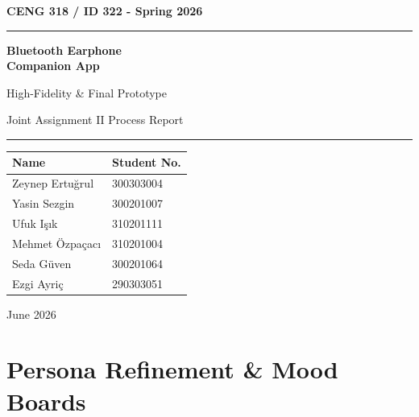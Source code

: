 \documentclass[12pt, a4paper]{report}
\begin{document}

\begin{titlepage}
  \centering
  \vspace*{2cm}
  {\large\bfseries CENG 318 / ID 322 - Spring 2026}\par
  \vspace{1cm}
  \rule{\linewidth}{1.5pt}\par\vspace{0.5cm}
  {\Huge\bfseries Bluetooth Earphone\\[0.3cm]Companion App}\par
  \vspace{0.4cm}
  {\LARGE High-Fidelity \& Final Prototype}\par
  \vspace{0.3cm}
  {\large Joint Assignment II Process Report}\par
  \vspace{0.5cm}
  \rule{\linewidth}{1.5pt}\par
  \vspace{1.5cm}

  {\large
    \begin{tabular}{ll}
      \toprule
      Name & Student No. \\
      \midrule
      Zeynep Ertuğrul & 300303004 \\
      Yasin Sezgin & 300201007 \\
      Ufuk Işık & 310201111 \\
      Mehmet Özpaçacı & 310201004 \\
      Seda Güven & 300201064 \\
      Ezgi Ayriç & 290303051 \\
      \bottomrule
    \end{tabular}
  }\par
  \vspace{1.5cm}

  \vfill
  {\large June 2026}
\end{titlepage}

\tableofcontents
\listoffigures
\listoftables
\clearpage

\chapter{Persona Refinement \& Mood Boards}
\end{document}

